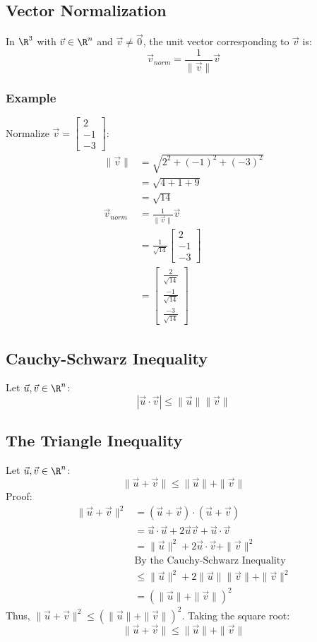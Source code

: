 \documentclass[letterpaper, 12pt]{math}
\begin{document}
\subsection*{Vector Normalization}
In \( \R^3 \) with \( \vec{v}\in\R^n \) and \( \vec{v}\neq\vec{0} \), the
unit vector corresponding to \( \vec{v} \) is:
\[ \vec{v}_{norm} = \frac{1}{\|\vec{v}\|}\vec{v} \]

\subsubsection*{Example}
Normalize \( \vec{v} = \begin{bmatrix}2 \\ -1 \\ -3\end{bmatrix} \):
\begin{align*}
  \|\vec{v}\| &= \sqrt{2^2+(-1)^2+(-3)^2} \\
  &= \sqrt{4+1+9} \\
  &= \sqrt{14} \\
  \vec{v}_{norm} &= \frac{1}{\|\vec{v}\|}\vec{v} \\
  &= \frac{1}{\sqrt{14}}\begin{bmatrix}2 \\ -1 \\ -3\end{bmatrix} \\
  &= \begin{bmatrix}
    \frac{2}{\sqrt{14}} \\
    \frac{-1}{\sqrt{14}} \\
    \frac{-3}{\sqrt{14}}
  \end{bmatrix}
\end{align*}

\subsection*{Cauchy-Schwarz Inequality}
Let \( \vec{u},\vec{v}\in\R^n \):
\[ |\vec{u}\cdot\vec{v}|\leq\|\vec{u}\|\|\vec{v}\| \]

\subsection*{The Triangle Inequality}
Let \( \vec{u},\vec{v}\in\R^n \):
\[ \|\vec{u}+\vec{v}\|\leq\|\vec{u}\|+\|\vec{v}\| \]
Proof:
\begin{align*}
  \|\vec{u}+\vec{v}\|^2 &= (\vec{u}+\vec{v})\cdot(\vec{u}+\vec{v}) \\
  &= \vec{u}\cdot\vec{u}+2\vec{u}\vec{v}+\vec{u}\cdot\vec{v} \\
  &= \|\vec{u}\|^2+2\vec{u}\cdot\vec{v}+\|\vec{v}\|^2 \\
  & \textrm{By the Cauchy-Schwarz Inequality} \\
  &\leq \|\vec{u}\|^2+2\|\vec{u}\|\|\vec{v}\|+\|\vec{v}\|^2 \\
  &= (\|\vec{u}\|+\|\vec{v}\|)^2
\end{align*}
Thus, \( \|\vec{u}+\vec{v}\|^2 \leq (\|\vec{u}\|+\|\vec{v}\|)^2 \). Taking the
square root:
\[ \|\vec{u}+\vec{v}\|\leq\|\vec{u}\|+\|\vec{v}\| \]
\end{document}
